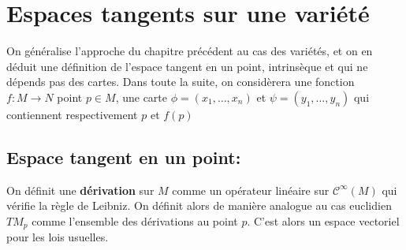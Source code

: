 \chapter{Espaces tangents sur une variété}
On généralise l'approche du chapitre précédent au cas des variétés, et on en déduit une définition de l'espace tangent en un point, intrinsèque et qui ne dépends pas des cartes. Dans toute la suite, on considèrera une fonction \( f : M \longrightarrow N \) point \( p \in M \), une carte \( \phi = (x_1, \ldots, x_n) \) et \( \psi = (y_1, \ldots, y_n) \) qui contiennent respectivement \( p \) et \( f(p) \)
\section{Espace tangent en un point:}
On définit une \textbf{dérivation} sur \( M \) comme un opérateur linéaire sur \( \mathcal{C}^\infty(M) \) qui vérifie la règle de Leibniz. On définit alors de manière analogue au cas euclidien \( TM_p \) comme l'ensemble des dérivations au point \( p \). C'est alors un espace vectoriel pour les lois usuelles.
